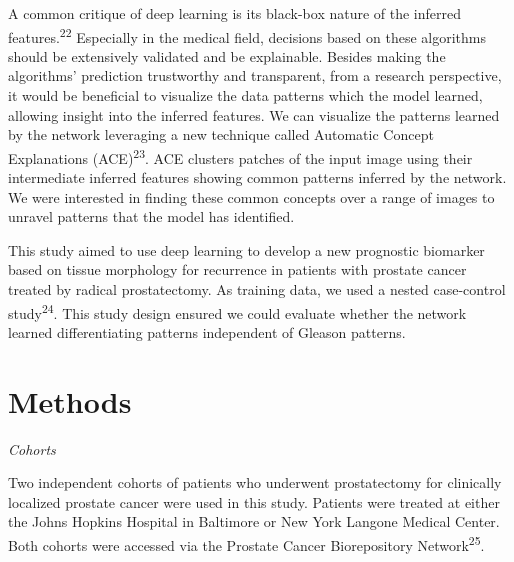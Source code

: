 \documentclass[
  12pt,
  a5,margin=2cmpaper,
]{article}
\begin{document}
A common critique of deep learning is its black-box nature of the
inferred features.\textsuperscript{22} Especially in the medical field,
decisions based on these algorithms should be extensively validated and
be explainable. Besides making the algorithms' prediction trustworthy
and transparent, from a research perspective, it would be beneficial to
visualize the data patterns which the model learned, allowing insight
into the inferred features. We can visualize the patterns learned by the
network leveraging a new technique called Automatic Concept Explanations
(ACE)\textsuperscript{23}. ACE clusters patches of the input image using
their intermediate inferred features showing common patterns inferred by
the network. We were interested in finding these common concepts over a
range of images to unravel patterns that the model has identified.

This study aimed to use deep learning to develop a new prognostic
biomarker based on tissue morphology for recurrence in patients with
prostate cancer treated by radical prostatectomy. As training data, we
used a nested case-control study\textsuperscript{24}. This study design
ensured we could evaluate whether the network learned differentiating
patterns independent of Gleason patterns.

\hypertarget{methods}{%
\section{Methods}\label{methods}}

\emph{Cohorts}

Two independent cohorts of patients who underwent prostatectomy for
clinically localized prostate cancer were used in this study. Patients
were treated at either the Johns Hopkins Hospital in Baltimore or New
York Langone Medical Center. Both cohorts were accessed via the Prostate
Cancer Biorepository Network\textsuperscript{25}.
\end{document}
